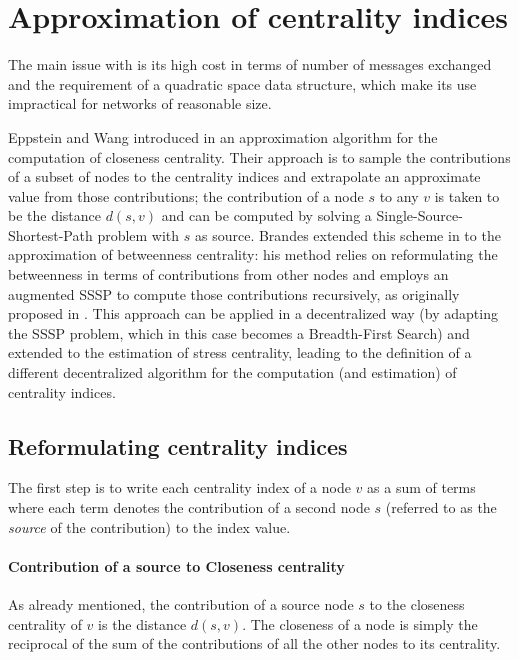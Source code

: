 
\section{Approximation of centrality indices}
\label{sec:mbfs}

The main issue with \deccen{} is its high cost in terms of number of messages exchanged and the requirement of a quadratic space data structure, which make its use impractical for networks of reasonable size.

Eppstein and Wang introduced in \cite{ew2004} an approximation algorithm for the computation of closeness centrality. Their approach is to sample the contributions of a subset of nodes to the centrality indices and extrapolate an approximate value from those contributions; the contribution of a node $s$ to any $v$ is taken to be the distance $d(s,v)$ and can be computed by solving a Single-Source-Shortest-Path problem with $s$ as source. Brandes extended this scheme in \cite{brandes2007} to the approximation of betweenness centrality: his method relies on reformulating the betweenness in terms of contributions from other nodes and employs an augmented SSSP to compute those contributions recursively, as originally proposed in \cite{brandes2001}. This approach can be applied in a decentralized way (by adapting the SSSP problem, which in this case becomes a Breadth-First Search) and extended to the estimation of stress centrality, leading to the definition of a different decentralized algorithm for the computation (and estimation) of centrality indices.

\subsection{Reformulating centrality indices}

The first step is to write each centrality index of a node $v$ as a sum of terms where each term denotes the contribution of a second node $s$ (referred to as the \emph{source} of the contribution) to the index value.

\paragraph{Contribution of a source to Closeness centrality}
As already mentioned, the contribution of a source node $s$ to the closeness centrality of $v$ is the distance $d(s,v)$. The closeness of a node is simply the reciprocal of the sum of the contributions of all the other nodes to its centrality.

